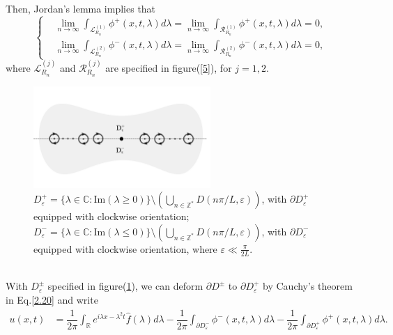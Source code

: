 \documentclass[12pt]{article}
\numberwithin{equation}{section}
\begin{document}
Then, Jordan's lemma implies that 
\begin{equation}
    \begin{cases}
    &\lim\limits_{n\to\infty}\int_{\mathcal{L}^{(1)}_{R_n}} \phi^{+}(x,t,\lambda)d\lambda=\lim\limits_{n\to\infty}\int_{\mathcal{R}^{(1)}_{R_n}} \phi^{+}(x,t,\lambda)d\lambda=0,\\
    &\lim\limits_{n\to\infty}\int_{\mathcal{L}^{(2)}_{R_n}} \phi^{-}(x,t,\lambda)d\lambda=\lim\limits_{n\to\infty}\int_{\mathcal{R}^{(2)}_{R_n}} \phi^{-}(x,t,\lambda)d\lambda=0,
    \end{cases}
\end{equation}
where $\mathcal{L}^{(j)}_{R_n}$ and $\mathcal{R}^{(j)}_{R_n}$ are specified in figure(\ref{5}), for $j=1,2$.
\begin{figure}[h]
    \centering 
    \includegraphics[width=0.60\textwidth]{Fokas 2.5.pdf}
    \caption{$D^+_{\varepsilon}=\{\lambda\in\mathbb{C}:\text{Im}(\lambda\geqslant 0)\}\setminus(\bigcup_{n\in\mathbb{Z}^*}D(n\pi/L,\varepsilon))$, with $\partial D^+_{\varepsilon}$ equipped with clockwise orientation; $D^-_{\varepsilon}=\{\lambda\in\mathbb{C}:\text{Im}(\lambda\leqslant 0)\}\setminus(\bigcup_{n\in\mathbb{Z}^*}D(n\pi/L,\varepsilon))$, with $\partial D^-_{\varepsilon}$ equipped with clockwise orientation, where $\varepsilon\ll\frac{\pi}{2L}$.}
    \label{6}
\end{figure}\\
With $D^{\pm}_{\varepsilon}$ specified in figure(\ref{6}), we can deform $\partial D^{\pm}$ to $\partial D^+_{\varepsilon}$ by Cauchy's theorem in Eq.\eqref{2.20} and write
\begin{equation*}
    \begin{split}
        u(x,t)&=\dfrac{1}{2\pi}\int_{\mathbb{R}} e^{i\lambda x-\lambda^2t}\hat{f}(\lambda)d\lambda-\dfrac{1}{2\pi}\int_{\partial D^-_{\varepsilon}} \phi^{-}(x,t,\lambda) d\lambda -\dfrac{1}{2\pi}\int_{\partial D^+_{\varepsilon}} \phi^{+}(x,t,\lambda) d\lambda.
    \end{split}
\end{equation*}
\end{document}
